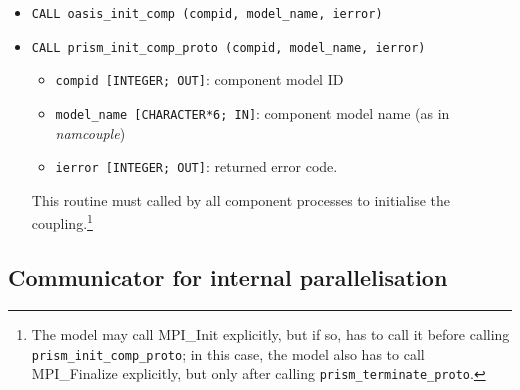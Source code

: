 \begin{itemize}

\item {\tt CALL oasis\_init\_comp        (compid, model\_name, ierror)} 
\item {\tt CALL prism\_init\_comp\_proto (compid, model\_name, ierror)} 

 \begin{itemize}
   \item {\tt compid [INTEGER; OUT]}: component model ID 
   \item {\tt model\_name [CHARACTER*6; IN]}: component model name (as in
  {\em namcouple}) 
   \item {\tt ierror [INTEGER; OUT]}: returned error code.
 \end{itemize}
 
This routine must called by all component processes to initialise the
coupling.\footnote{The model may call MPI\_Init explicitly, but if so, has to
call it before calling {\tt prism\_init\_comp\_proto}; in this case, the
model also has to call MPI\_Finalize explicitly, but only after calling
{\tt prism\_terminate\_proto}.}
\end{itemize}

\subsection{Communicator for internal parallelisation}

